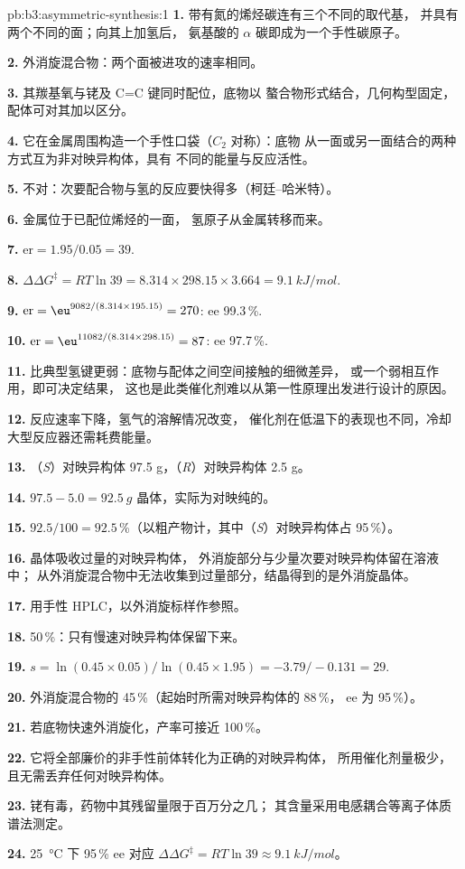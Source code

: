 \begin{solution}{pb:b3:asymmetric-synthesis:1}
\textbf{1.} 带有氮的烯烃碳连有三个不同的取代基，
并具有两个不同的面；向其上加氢后，
氨基酸的 $\alpha$ 碳即成为一个手性碳原子。

\textbf{2.} 外消旋混合物：两个面被进攻的速率相同。

\textbf{3.} 其羰基氧与铑及 C=C 键同时配位，底物以
螯合物形式结合，几何构型固定，配体可对其加以区分。

\textbf{4.} 它在金属周围构造一个手性口袋（$C_2$ 对称）：底物
从一面或另一面结合的两种方式互为非对映异构体，具有
不同的能量与反应活性。

\textbf{5.} 不对：次要配合物与氢的反应要快得多（柯廷–哈米特）。

\textbf{6.} 金属位于已配位烯烃的一面，
氢原子从金属转移而来。

\textbf{7.} $\mathrm{er} = 1.95/0.05 = 39$.

\textbf{8.} $\Delta\Delta G^\ddagger = RT\ln 39 = 8.314 \times 298.15 \times 3.664 = \qty{9.1}{kJ/mol}$.

\textbf{9.} $\mathrm{er} = \eu^{9082/(8.314 \times 195.15)} = 270$: ee 99.3\,\%.

\textbf{10.} $\mathrm{er} = \eu^{11082/(8.314 \times 298.15)} = 87$: ee 97.7\,\%.

\textbf{11.} 比典型氢键更弱：底物与配体之间空间接触的细微差异，
或一个弱相互作用，即可决定结果，
这也是此类催化剂难以从第一性原理出发进行设计的原因。

\textbf{12.} 反应速率下降，氢气的溶解情况改变，
催化剂在低温下的表现也不同，冷却大型反应器还需耗费能量。

\textbf{13.} （\textit{S}）对映异构体 97.5 g，（\textit{R}）对映异构体 2.5 g。

\textbf{14.} $97.5 - 5.0 = \qty{92.5}{g}$ 晶体，实际为对映纯的。

\textbf{15.} $92.5/100 = 92.5$\,\%（以粗产物计，其中（\textit{S}）对映异构体占 95\,\%）。

\textbf{16.} 晶体吸收过量的对映异构体，
外消旋部分与少量次要对映异构体留在溶液中；
从外消旋混合物中无法收集到过量部分，结晶得到的是外消旋晶体。

\textbf{17.} 用手性 HPLC，以外消旋标样作参照。

\textbf{18.} 50\,\%：只有慢速对映异构体保留下来。

\textbf{19.} $s = \ln(0.45 \times 0.05)/\ln(0.45 \times 1.95) = -3.79/-0.131 = 29$.

\textbf{20.} 外消旋混合物的 45\,\%（起始时所需对映异构体的 88\,\%，
ee 为 95\,\%）。

\textbf{21.} 若底物快速外消旋化，产率可接近 100\,\%。

\textbf{22.} 它将全部廉价的非手性前体转化为正确的对映异构体，
所用催化剂量极少，且无需丢弃任何对映异构体。

\textbf{23.} 铑有毒，药物中其残留量限于百万分之几；
其含量采用电感耦合等离子体质谱法测定。

\textbf{24.} \qty{25}{\celsius} 下 95\,\% ee 对应 $\Delta\Delta G^\ddagger = RT\ln 39 \approx \qty{9.1}{kJ/mol}$。
\end{solution}
